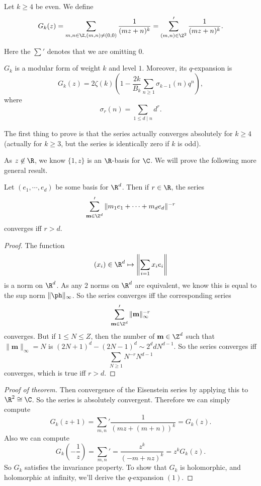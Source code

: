 \documentclass[a4paper]{article}
\begin{document}
\begin{defi}
  Let $k \geq 4$ be even. We define
  \[
    G_k(z) = \sum_{m, n \in \Z, (m, n) \not= (0, 0)} \frac{1}{(mz + n)^k} = \sum_{(m, n) \in \Z^2}' \frac{1}{(mz + n)^k}.
  \]
\end{defi}
Here the $\sum'$ denotes that we are omitting $0$.

\begin{thm}
  $G_k$ is a modular form of weight $k$ and level $1$. Moreover, its $q$-expansion is
  \[
    G_k(z) = 2 \zeta(k) \left(1 - \frac{2k}{B_k} \sum_{n \geq 1} \sigma_{k - 1}(n) q^n\right),\tag{$1$}
  \]
  where
  \[
    \sigma_r(n) = \sum_{1 \leq d \mid n} d^r.
  \]
\end{thm}

The first thing to prove is that the series actually converges absolutely for $k \geq 4$ (actually for $k \geq 3$, but the series is identically zero if $k$ is odd).

As $z \not \in \R$, we know $\{1, z\}$ is an $\R$-basis for $\C$. We will prove the following more general result.
\begin{prop}
  Let $(e_1, \cdots, e_d)$ be some basis for $\R^d$. Then if $r \in \R$, the series
  \[
    \sum'_{\mathbf{m} \in \Z^d} \|m_1 e_1 + \cdots + m_d e_d\|^{-r}
  \]
  converges iff $r > d$.
\end{prop}

\begin{proof}
  The function
  \[
    (x_i) \in \R^d \mapsto \left\|\sum_{i = 1} x_i e_i \right\|
  \]
  is a norm on $\R^d$. As any $2$ norms on $\R^d$ are equivalent, we know this is equal to the sup norm $\|\ph\|_\infty$. So the series converges iff the corresponding series
  \[
    \sum_{\mathbf{m} \in \Z^d}' \|\mathbf{m}\|_\infty^{-r}
  \]
  converges. But if $1 \leq N \leq Z$, then the number of $\mathbf{m} \in \Z^d$ such that $\|\mathbf{m}\|_\infty = N$ is $(2N + 1)^d - (2N - 1)^d \sim 2^d d N^{d - 1}$. So the series converges iff
  \[
    \sum_{N \geq 1} N^{-r} N^{d - 1}
  \]
  converges, which is true iff $r > d$.
\end{proof}

\begin{proof}[Proof of theorem]
  Then convergence of the Eisenstein series by applying this to $\R^2 \cong \C$. So the series is absolutely convergent. Therefore we can simply compute
  \[
    G_k(z + 1) = \sum_{m, n}' \frac{1}{(mz + (m + n))^k} = G_k(z).
  \]
  Also we can compute
  \[
    G_k\left(-\frac{1}{z}\right) = \sum_{m, n}' = \frac{z^k}{(-m + nz)^k} = z^k G_k(z).
  \]
  So $G_k$ satisfies the invariance property. To show that $G_k$ is holomorphic, and holomorphic at infinity, we'll derive the $q$-expansion $(1)$.
\end{proof}
\end{document}
